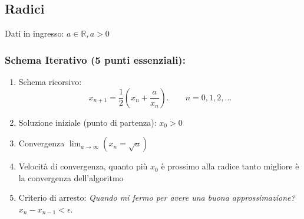 \subsection{Radici}
Dati in ingresso: $a\in\mathbb{R}, a > 0$
\newline
\subsubsection{Schema Iterativo (5 punti essenziali):}
\begin{enumerate}
    \item Schema ricorsivo: 
    \begin{displaymath}
        x_{n+1} = \frac{1}{2}(x_n + \frac{a}{x_n}). \qquad n = 0, 1, 2, ...
    \end{displaymath}
    \item Soluzione iniziale (punto di partenza): $x_0 > 0$
    \item Convergenza $\lim_{a \rightarrow \infty}(x_n = \sqrt{a})$
    \item Velocità di convergenza, quanto più $x_0$ è prossimo alla radice tanto migliore è la convergenza dell'algoritmo
    \item Criterio di arresto: \textit{Quando mi fermo per avere una buona approssimazione?} $x_n - x_{n-1} < \epsilon$.
\end{enumerate}

